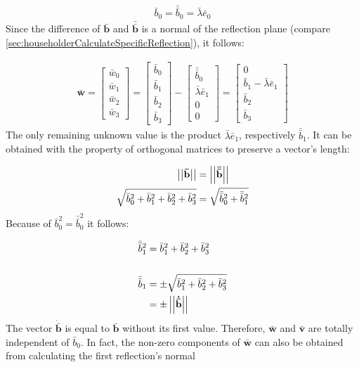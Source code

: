 \begin{align}
\bar{b}_0 = \bar{\bar{b}}_0 = \bar{\lambda}\bar{e}_0
\end{align}
%
Since the difference of $\mathbf{\bar{b}}$ and $\mathbf{\bar{\bar{b}}}$ is a normal of the reflection plane (compare \cref{sec:householderCalculateSpecificReflection}), it follows:

\begin{align}
\mathbf{\bar{w}}
= 
\begin{bmatrix}
\bar{w}_0\\
\bar{w}_1\\
\bar{w}_2\\
\bar{w}_3
\end{bmatrix}
= 
\begin{bmatrix}
\bar{b}_0\\
\bar{b}_1\\
\bar{b}_2\\
\bar{b}_3
\end{bmatrix}
-
\begin{bmatrix}
\bar{\bar{b}}_0\\
\bar{\lambda}\bar{e}_1\\
0\\
0
\end{bmatrix}
=
\begin{bmatrix}
0\\
\bar{b}_1 - \bar{\lambda}\bar{e}_1\\
\bar{b}_2\\
\bar{b}_3
\end{bmatrix}
\end{align}
%
The only remaining unknown value is the product $\bar{\lambda}\bar{e}_1$, respectively $\bar{\bar{b}}_1$.
It can be obtained with the property of orthogonal matrices to preserve a vector's length:

\begin{align}
\left\vert\left\vert\mathbf{\bar{b}}\right\vert\right\vert 
&= 
\left\vert\left\vert\mathbf{\bar{\bar{b}}}\right\vert\right\vert
\\
\sqrt{\bar{b}_0^2 + \bar{b}_1^2 + \bar{b}_2^2 + \bar{b}_3^2}
&=
\sqrt{\bar{\bar{b}}_0^2 + \bar{\bar{b}}_1^2}
\end{align}
%
Because of $\bar{b}_0^2 = \bar{\bar{b}}_0^2$ it follows:

\begin{align}
\bar{\bar{b}}_1^2
&=
\bar{b}_1^2 + \bar{b}_2^2 + \bar{b}_3^2 
\\
\\
\bar{\bar{b}}_1
&=
\pm \sqrt{\bar{b}_1^2 + \bar{b}_2^2 + \bar{b}_3^2}
\\
&= \pm \left\vert\left\vert\mathbf{\dot{\bar{b}}}\right\vert\right\vert
\end{align}
%
The vector $\mathbf{\dot{\bar{b}}}$ is equal to $\mathbf{\bar{b}}$ without its first value.
Therefore, $\mathbf{\bar{w}}$ and $\mathbf{\bar{v}}$ are totally independent of $\bar{b}_0$.
In fact, the non-zero components of $\mathbf{\bar{w}}$ can also be obtained from calculating the first reflection's normal 


